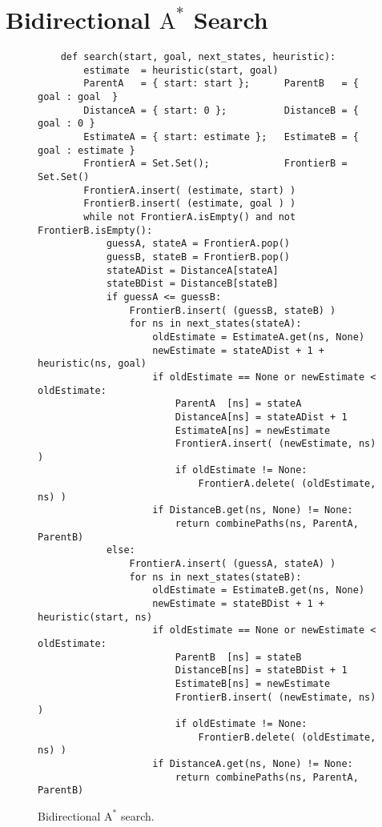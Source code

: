 \section{Bidirectional $\mathrm{A}^*$ Search}
\begin{figure}[!ht]
\centering
\begin{verbatim}
    def search(start, goal, next_states, heuristic):
        estimate  = heuristic(start, goal)
        ParentA   = { start: start };      ParentB   = { goal : goal  }
        DistanceA = { start: 0 };          DistanceB = { goal : 0 }
        EstimateA = { start: estimate };   EstimateB = { goal : estimate }
        FrontierA = Set.Set();             FrontierB = Set.Set()
        FrontierA.insert( (estimate, start) )
        FrontierB.insert( (estimate, goal ) )
        while not FrontierA.isEmpty() and not FrontierB.isEmpty():
            guessA, stateA = FrontierA.pop()
            guessB, stateB = FrontierB.pop()
            stateADist = DistanceA[stateA]
            stateBDist = DistanceB[stateB]
            if guessA <= guessB:
                FrontierB.insert( (guessB, stateB) )
                for ns in next_states(stateA):
                    oldEstimate = EstimateA.get(ns, None)
                    newEstimate = stateADist + 1 + heuristic(ns, goal)
                    if oldEstimate == None or newEstimate < oldEstimate:
                        ParentA  [ns] = stateA
                        DistanceA[ns] = stateADist + 1
                        EstimateA[ns] = newEstimate
                        FrontierA.insert( (newEstimate, ns) )
                        if oldEstimate != None:
                            FrontierA.delete( (oldEstimate, ns) )
                    if DistanceB.get(ns, None) != None:
                        return combinePaths(ns, ParentA, ParentB)
            else:
                FrontierA.insert( (guessA, stateA) )
                for ns in next_states(stateB):
                    oldEstimate = EstimateB.get(ns, None)
                    newEstimate = stateBDist + 1 + heuristic(start, ns)
                    if oldEstimate == None or newEstimate < oldEstimate:
                        ParentB  [ns] = stateB
                        DistanceB[ns] = stateBDist + 1
                        EstimateB[ns] = newEstimate
                        FrontierB.insert( (newEstimate, ns) )
                        if oldEstimate != None:
                            FrontierB.delete( (oldEstimate, ns) )
                    if DistanceA.get(ns, None) != None:
                        return combinePaths(ns, ParentA, ParentB)                    
\end{verbatim}
\vspace*{-0.3cm}
\caption{Bidirectional $\mathrm{A}^*$ search.}
\label{fig:Bidirectional-A-Star-Search.ipynb}
\end{figure}
